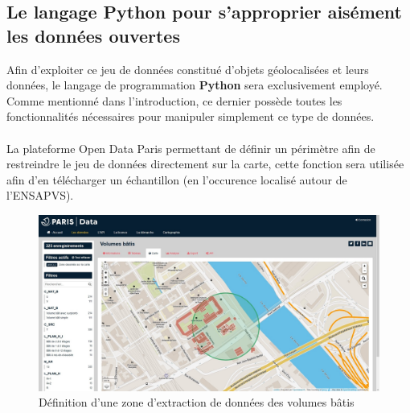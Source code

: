 \documentclass[
  11pt,
  french,
]{article}
\begin{document}
\newpage

\hypertarget{le-langage-python-pour-sapproprier-aisuxe9ment-les-donnuxe9es-ouvertes}{%
\subsection{Le langage Python pour s'approprier aisément les données
ouvertes}\label{le-langage-python-pour-sapproprier-aisuxe9ment-les-donnuxe9es-ouvertes}}

Afin d'exploiter ce jeu de données constitué d'objets géolocalisées et
leurs données, le langage de programmation \textbf{Python} sera
exclusivement employé. Comme mentionné dans l'introduction, ce dernier
possède toutes les fonctionnalités nécessaires pour manipuler simplement
ce type de données.\\
~\\
La plateforme Open Data Paris permettant de définir un périmètre afin de
restreindre le jeu de données directement sur la carte, cette fonction
sera utilisée afin d'en télécharger un échantillon (en l'occurence
localisé autour de l'ENSAPVS).\\

\begin{tcolorbox}
\begin{figure}

{\centering \includegraphics[width=0.9\linewidth]{__imgs/site_odp_carte_zone} 

}

\caption[Définition d'une zone d'extraction de données des volumes bâtis  -  https://opendata.paris.fr/]{Définition d'une zone d'extraction de données des volumes bâtis}\label{fig:odp_carte_zone}
\end{figure}
\end{tcolorbox}
\end{document}
